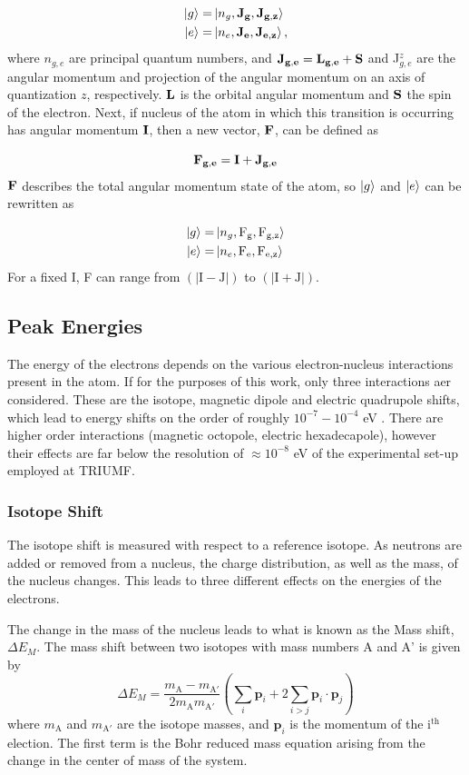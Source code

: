 \begin{align}
\ket{g} =& \ket{n_g,\mathrm{\bf{J}_g,J_{g,z}}}\\
\ket{e} =& \ket{n_e,\mathrm{\bf{J}_e,J_{e,z}}},
\end{align}
where $n_{g,e}$ are principal quantum numbers, and $\bf{J}_{g,e}=\bf{L}_{g,e}+S$ and J$_{g,e}^z$ are the angular momentum and projection of the angular momentum on an axis of quantization $z$, respectively. $\bf{L}$ is the orbital angular momentum and $\bf{S}$ the spin of the electron. Next, if nucleus of the atom in which this transition is occurring has angular momentum $\bf{I}$, then a new vector, $\bf{F}$, can be defined as 

\begin{equation}
\bf{F_{g,e}} = \bf{I} + \bf{J}_{g,e}
\end{equation}
$\bf{F}$ describes the total angular momentum state of the atom, so $\ket{g}$ and $\ket{e}$ can be rewritten as

\begin{align}
\ket{g} =& \ket{n_g,\mathrm{F_g, F_{g,z}}}\\
\ket{e} =& \ket{n_e,\mathrm{F_e, F_{e,z}}}
\end{align}
For a fixed I, F can range from $(|\mathrm{I-J}|)$ to $(|\mathrm{I+J}|)$.
\subsection{Peak Energies}
The energy of the electrons depends on the various electron-nucleus interactions present in the atom. If for the purposes of this work, only three interactions aer considered. These are the isotope, magnetic dipole and electric quadrupole shifts, which lead to energy shifts on the order of roughly $10^{-7}-10^{-4}$ eV \cite{ModAN}. There are higher order interactions (magnetic octopole, electric hexadecapole), however their effects are far below the resolution of $\approx 10^{-8}$ eV of the experimental set-up employed at TRIUMF\cite{GA69}.

\subsubsection{Isotope Shift}
The isotope shift is measured with respect to a reference isotope. As neutrons are added or removed from a nucleus, the charge distribution, as well as the mass, of the nucleus changes. This leads to three different effects on the energies of the electrons. 

The change in the mass of the nucleus leads to what is known as the Mass shift, $\Delta E_M$. The mass shift between two isotopes with mass numbers A and A' is given by \citep{TomT}
\begin{equation}
\Delta E_M = \frac{m_{\mathrm{A}}-m_{\mathrm{A'}}}{2 m_{\mathrm{A}} m_{\mathrm{A'}}} \left(\sum_i\mathrm{\textbf{p}}_i +2 \sum_{i>j}\mathrm{\textbf{p}}_i \cdot \mathrm{\textbf{p}}_j \right)
\end{equation}
where $m_{\mathrm{A}}$ and $m_{\mathrm{A'}}$ are the isotope masses, and $\textbf{p}_i$ is the momentum of the i$^{\mathrm{th}}$ election. The first term is the Bohr reduced mass equation arising from the change in the center of mass of the system.

